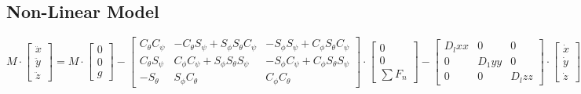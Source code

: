 \documentclass[12pt,a4paper,twoside]{report}
\begin{document}
				 \subsection*{Non-Linear Model}
				 	
				 	$$ 
				 	M 
				 	\cdot 
				 	\begin{bmatrix}
				 	\ddot{x} \\
				 	\ddot{y} \\
				 	\ddot{z}
				 	\end{bmatrix}
				 	=
				 	M 
				 	\cdot
				 	\begin{bmatrix}
				 	0 \\
				 	0 \\
				 	g
				 	\end{bmatrix}
				 	-
				 	\begin{bmatrix}
				 	C_\theta C_\psi & -C_\theta S_\psi + S_\phi S_\theta C_\psi & -S_\phi S_\psi + C_\phi S_\theta C_\psi \\
				 	C_\theta S_\psi &  C_\phi C_\psi + S_\phi S_\theta S_\psi   & -S_\phi C_\psi + C_\phi S_\theta S_\psi \\
				 	-S_\theta       &  S_\phi C_\theta                          &  C_\phi C_\theta
				 	\end{bmatrix}
				 	\cdot
				 	\begin{bmatrix}
				 	0 \\
				 	0 \\
				 	\sum F_n 
				 	\end{bmatrix}
				 	-
				 	\begin{bmatrix}
				 	D_lxx & 0 & 0 \\
				 	0 & D_1yy & 0 \\
				 	0 & 0 & D_lzz
				 	\end{bmatrix}
				 	\cdot
				 	\begin{bmatrix}
				 	\dot{x} \\
				 	\dot{y} \\
				 	\dot{z} 
				 	\end{bmatrix}
				 	$$ 
				 	\\
\end{document}
